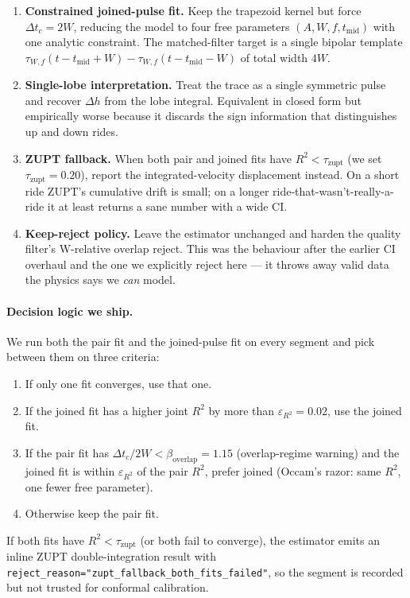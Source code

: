 \begin{enumerate}
  \item \textbf{Constrained joined-pulse fit.} Keep the trapezoid
        kernel but force $\Delta t_c = 2W$, reducing the model to
        four free parameters $(A, W, f, t_\mathrm{mid})$ with one
        analytic constraint. The matched-filter target is a single
        bipolar template $\tau_{W,f}(t-t_\mathrm{mid}+W) -
        \tau_{W,f}(t-t_\mathrm{mid}-W)$ of total width $4W$.
  \item \textbf{Single-lobe interpretation.} Treat the trace as a
        single symmetric pulse and recover $\Delta h$ from the lobe
        integral. Equivalent in closed form but empirically worse
        because it discards the sign information that distinguishes
        up and down rides.
  \item \textbf{ZUPT fallback.} When both pair and joined fits have
        $R^2 < \tau_\mathrm{zupt}$ (we set $\tau_\mathrm{zupt}=0.20$),
        report the integrated-velocity displacement instead. On a
        short ride ZUPT's cumulative drift is small; on a longer
        ride-that-wasn't-really-a-ride it at least returns a sane
        number with a wide CI.
  \item \textbf{Keep-reject policy.} Leave the estimator unchanged
        and harden the quality filter's W-relative overlap reject.
        This was the behaviour after the earlier CI overhaul and
        the one we explicitly reject here — it throws away valid
        data the physics says we \emph{can} model.
\end{enumerate}

\paragraph{Decision logic we ship.} We run both the pair fit and
the joined-pulse fit on every segment and pick between them on
three criteria:
\begin{enumerate}
  \item If only one fit converges, use that one.
  \item If the joined fit has a higher joint $R^2$ by more than
        $\varepsilon_{R^2}=0.02$, use the joined fit.
  \item If the pair fit has $\Delta t_c/2W < \beta_\mathrm{overlap}=1.15$
        (overlap-regime warning) and the joined fit is within
        $\varepsilon_{R^2}$ of the pair $R^2$, prefer joined
        (Occam's razor: same $R^2$, one fewer free parameter).
  \item Otherwise keep the pair fit.
\end{enumerate}
If both fits have $R^2 < \tau_\mathrm{zupt}$ (or both fail to
converge), the estimator emits an inline ZUPT double-integration
result with \texttt{reject\_reason="zupt\_fallback\_both\_fits\_failed"},
so the segment is recorded but not trusted for conformal
calibration.

